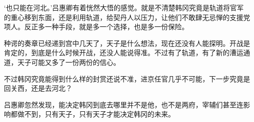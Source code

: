 ‘也只能在河北。’吕惠卿有着恍然大悟的感觉。就是不清楚韩冈究竟是轨道将官军的重心移到东面，还是利用轨道，给契丹人以压力，让他们不敢肆无忌惮的支援党项人。反正多一种手段，就是多一个选择，也是多一份保险。

种谔的奏章已经递到宫中几天了，天子是什么想法，现在还没有人能探明。开战是肯定的，到底是什么时候开战，还没人能说得准。不过有了轨道，有了新的漕运通道，天子可能又多了一份两份的信心。

不过韩冈究竟能得到什么样的封赏还说不准，进京任官几乎不可能，下一步究竟是回关西，还是去河北？

吕惠卿忽然发现，能决定韩冈到底去哪里并不是他，也不是两府，宰辅们甚至连影响都做不到，只有天子，只有天子才能决定韩冈的未来。

